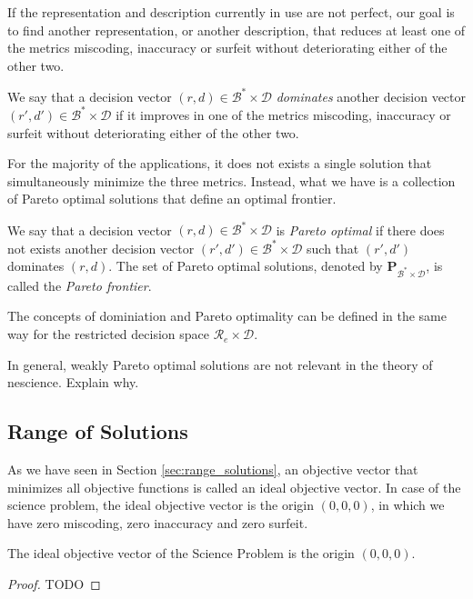 If the representation and description currently in use are not perfect, our goal is to find another representation, or another description, that reduces at least one of the metrics miscoding, inaccuracy or surfeit without deteriorating either of the other two.

\begin{definition}
We say that a decision vector $(r, d) \in \mathcal{B}^\ast \times \mathcal{D}$ \emph{dominates} another decision vector $(r', d') \in \mathcal{B}^\ast \times \mathcal{D}$ if it improves in one of the metrics miscoding, inaccuracy or surfeit without deteriorating either of the other two.
\end{definition}

For the majority of the applications, it does not exists a single solution that simultaneously minimize the three metrics. Instead, what we have is a collection of Pareto optimal solutions that define an optimal frontier.

\begin{definition}
We say that a decision vector $(r, d) \in \mathcal{B}^\ast \times \mathcal{D}$ is \emph{Pareto optimal} if there does not exists another decision vector $(r', d') \in \mathcal{B}^\ast \times \mathcal{D}$ such that $(r', d')$ dominates $(r, d)$. The set of Pareto optimal solutions, denoted by $\mathbf{P}_{\mathcal{B}^\ast \times \mathcal{D}}$, is called the \emph{Pareto frontier}.
\end{definition}

The concepts of dominiation and Pareto optimality can be defined in the same way for the restricted decision space $\mathcal{R}_e \times \mathcal{D}$.

In general, weakly Pareto optimal solutions are not relevant in the theory of nescience. {\color{red} Explain why.}


\subsection{Range of Solutions}

As we have seen in Section \ref{sec:range_solutions}, an objective vector that minimizes all objective functions is called an ideal objective vector. In case of the science problem, the ideal objective vector is the origin $(0, 0, 0)$, in which we have zero miscoding, zero inaccuracy and zero surfeit.

\begin{proposition}
The ideal objective vector of the Science Problem is the origin $(0, 0, 0)$.
\end{proposition}
\begin{proof}
{\color{red} TODO}
\end{proof}


